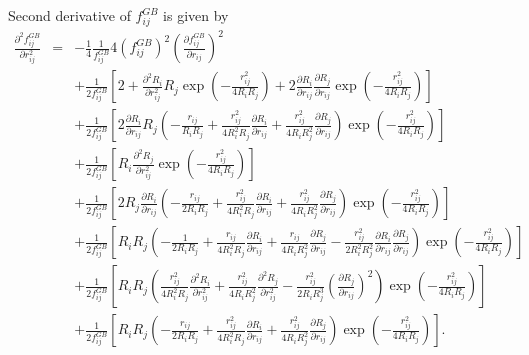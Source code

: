 \documentclass[12pt]{article}
\begin{document}
Second derivative of $f_{ij}^{GB}$ is given by
\begin{eqnarray}
\label{eq:fGB2ndDerv1}
\frac{\partial^{2}f_{ij}^{GB}}{\partial r_{ij}^{2}} & = & -\frac{1}{4}\frac{1}{f_{ij}^{GB}}4\left(f_{ij}^{GB}\right)^{2}\left(\frac{\partial f_{ij}^{GB}}{\partial r_{ij}}\right)^{2} \\ \nonumber
& & + \frac{1}{2f_{ij}^{GB}}\left[2 + \frac{\partial^{2} R_{i}}{\partial r_{ij}^2}R_{j}\exp(-\frac{r_{ij}^2}{4R_{i}R_{j}}) + 2\frac{\partial R_{i}}{\partial r_{ij}}\frac{\partial R_{j}}{\partial r_{ij}}\exp(-\frac{r_{ij}^2}{4R_{i}R_{j}}) \right] \\ \nonumber
& & + \frac{1}{2f_{ij}^{GB}}\left[ 2 \frac{\partial R_{i}}{\partial r_{ij}}R_{j}\left(- \frac{r_{ij}}{R_{i}R_{j}} + \frac{r_{ij}^{2}}{4R_{i}^{2}R_{j}}\frac{\partial R_{i}}{\partial r_{ij}} + \frac{r_{ij}^{2}}{4R_{i}R_{j}^{2}}\frac{\partial R_{j}}{\partial r_{ij}} \right)\exp(-\frac{r_{ij}^2}{4R_{i}R_{j}})\right] \\ \nonumber
& & + \frac{1}{2f_{ij}^{GB}}\left[R_{i}\frac{\partial^{2} R_{j}}{\partial r_{ij}^2}\exp(-\frac{r_{ij}^2}{4R_{i}R_{j}})\right] \\ \nonumber
& & + \frac{1}{2f_{ij}^{GB}}\left[ 2R_{j}\frac{\partial R_{i}}{\partial r_{ij}}\left(-\frac{r_{ij}}{2R_{i}R_{j}} + \frac{r_{ij}^2}{4R_{i}^{2}R_{j}}\frac{\partial R_{i}}{\partial r_{ij}} + \frac{r_{ij}^2}{4R_{i}R_{j}^{2}}\frac{\partial R_{j}}{\partial r_{ij}}  \right)\exp(-\frac{r_{ij}^2}{4R_{i}R_{j}}) \right] \\ \nonumber
& & + \frac{1}{2f_{ij}^{GB}}\left[R_{i}R_{j}\left(-\frac{1}{2R_{i}R_{j}} + \frac{r_{ij}}{4R_{i}^{2}R_{j}}\frac{\partial R_{i}}{\partial r_{ij}} + \frac{r_{ij}}{4R_{i}R_{j}^{2}}\frac{\partial R_{j}}{\partial r_{ij}}-\frac{r_{ij}^{2}}{2R_{i}^{2}R_{j}^{2}}\frac{\partial R_{i}}{\partial r_{ij}}\frac{\partial R_{j}}{\partial r_{ij}} \right)\exp(-\frac{r_{ij}^2}{4R_{i}R_{j}}) \right] \\ \nonumber
& & + \frac{1}{2f_{ij}^{GB}}\left[R_{i}R_{j}\left(\frac{r_{ij}^{2}}{4R_{i}^{2}R_{j}}\frac{\partial^{2}R_{i}}{\partial r_{ij}^2} + \frac{r_{ij}^{2}}{4R_{i}R_{j}^{2}}\frac{\partial^{2}R_{j}}{\partial r_{ij}^2} - \frac{r_{ij}^{2}}{2R_{i}R_{j}^{3}}(\frac{\partial R_{j}}{\partial r_{ij}})^{2}\right)\exp(-\frac{r_{ij}^2}{4R_{i}R_{j}}) \right] \\ \nonumber
& & + \frac{1}{2f_{ij}^{GB}}\left[ R_{i}R_{j}\left(-\frac{r_{ij}}{2R_{i}R_{j}} + \frac{r_{ij}^{2}}{4R_{i}^{2}R_{j}}\frac{\partial R_{i}}{\partial r_{ij}} + \frac{r_{ij}^{2}}{4R_{i}R_{j}^{2}}\frac{\partial R_{j}}{\partial r_{ij}} \right)\exp(-\frac{r_{ij}^2}{4R_{i}R_{j}}) \right].
\end{eqnarray}
\end{document}
